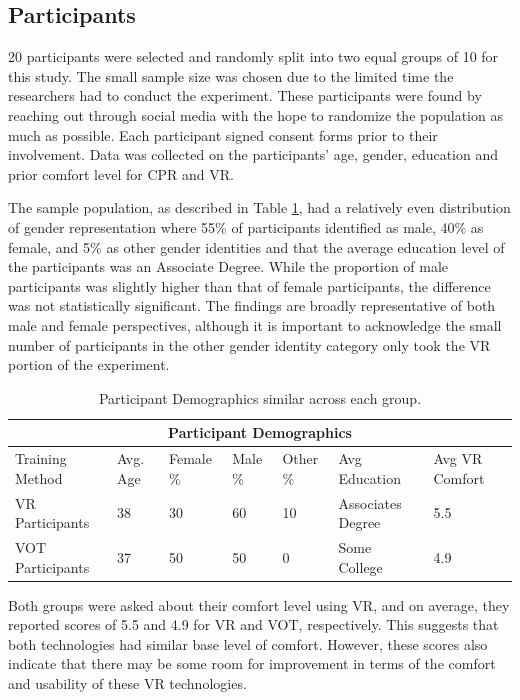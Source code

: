 \documentclass[manuscript]{./Models/acmart}
\begin{document}
\subsection{Participants}
20 participants were selected and randomly split into two equal groups of 10 for this study. The small sample size was chosen due to the limited time the researchers had to conduct the experiment. These participants were found by reaching out through social media with the hope to randomize the population as much as possible. Each participant signed consent forms prior to their involvement. Data was collected on the participants' age, gender, education and prior comfort level for CPR and VR. 

The sample population, as described in Table \ref{tab:Demographics}, had a relatively even distribution of gender representation where 55\% of participants identified as male, 40\% as female, and 5\% as other gender identities and that the average education level of the participants was an Associate Degree. While the proportion of male participants was slightly higher than that of female participants, the difference was not statistically significant. The findings are broadly representative of both male and female perspectives, although it is important to acknowledge the small number of participants in the other gender identity category only took the VR portion of the experiment. 

\begin{center}
\begin{table}[H]
\begin{tabular}{|p{}||p{}|p{}|p{}|p{}|p{}|p{}|}
    \hline
    \multicolumn{7}{|c|}{Participant Demographics} \\
    \hline
    Training Method & Avg. Age & Female \% & Male \% & Other \% & Avg Education & Avg VR Comfort\\
    \hline
    VR Participants & 38 & 30 & 60 & 10 & Associates Degree & 5.5\\
    VOT Participants & 37 & 50 & 50 & 0 & Some College & 4.9\\
    \hline
\end{tabular}
\caption{Participant Demographics similar across each group.}
\label{tab:Demographics}
\vspace{-11mm}
\end{table}
\end{center}

Both groups were asked about their comfort level using VR, and on average, they reported scores of 5.5 and 4.9 for VR and VOT, respectively. This suggests that both technologies had similar base level of comfort. However, these scores also indicate that there may be some room for improvement in terms of the comfort and usability of these VR technologies.
\end{document}

